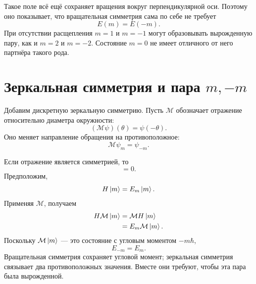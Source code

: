 Такое поле всё ещё сохраняет вращения вокруг перпендикулярной оси. Поэтому оно показывает, что вращательная симметрия сама по себе не требует
\begin{equation}
E(m)=E(-m).
\end{equation}
При отсутствии расщепления \(m=1\) и \(m=-1\) могут образовывать вырожденную пару, как и \(m=2\) и \(m=-2\). Состояние \(m=0\) не имеет отличного от него партнёра такого рода.

\section{Зеркальная симметрия и пара \texorpdfstring{\(m,-m\)}{m, -m}}

Добавим дискретную зеркальную симметрию. Пусть \(\mathcal M\) обозначает отражение относительно диаметра окружности:
\begin{equation}
(\mathcal M\psi)(\theta)=\psi(-\theta).
\end{equation}
Оно меняет направление обращения на противоположное:
\begin{equation}
\mathcal M\psi_m=\psi_{-m}.
\end{equation}

Если отражение является симметрией, то
\begin{equation}
[\mathcal M,H]=0.
\end{equation}
Предположим,
\begin{equation}
H\left\lvert m\right\rangle=E_m\left\lvert m\right\rangle.
\end{equation}
Применяя \(\mathcal M\), получаем
\begin{align}
H\mathcal M\left\lvert m\right\rangle
&=\mathcal M H\left\lvert m\right\rangle\\
&=E_m\mathcal M\left\lvert m\right\rangle.
\end{align}
Поскольку \(\mathcal M\left\lvert m\right\rangle\) — это состояние с угловым моментом \(-m\hbar\),
\begin{equation}
E_{-m}=E_m.
\end{equation}
Вращательная симметрия сохраняет угловой момент; зеркальная симметрия связывает два противоположных значения. Вместе они требуют, чтобы эта пара была вырожденной.

\begin{classroomqa}
\end{classroomqa}

